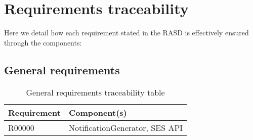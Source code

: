 \chapter{Requirements traceability}
	Here we detail how each requirement stated in the RASD is effectively ensured through the components:

	\section{General requirements}
			\begin{table}[H]
				\begin{tabular}{ | m{2.6cm} | m{9cm} | } 
					\hline
					\textbf {Requirement} & \textbf{Component(s)} \\
					\hline
						R00000 & NotificationGenerator, SES API \\
					\hline
				\end{tabular}
				\caption{General requirements traceability table}
			\end{table}
